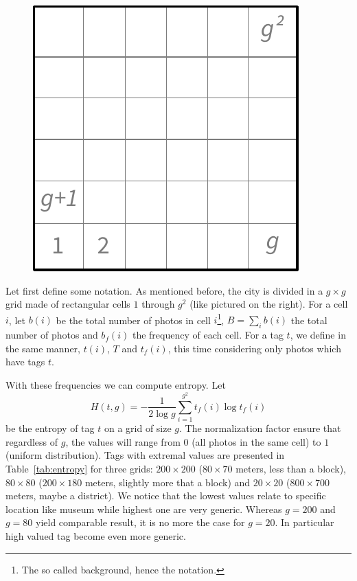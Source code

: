 \begin{figure}
\centering
\vspace{-.6\baselineskip}
\includegraphics[width=0.15\columnwidth]{grid}
\end{figure}
Let first define some notation. As mentioned before, the city is divided in a
$g\times g$ grid made of rectangular cells $1$ through $g^2$ (like pictured on
the right). For a cell $i$, let $b(i)$ be the total number of photos in cell
$i$\footnote{The so called background, hence the notation.}, $B=\sum_i b(i)$
the total number of photos and $b_f(i)$ the frequency of each cell. For a tag
$t$, we define in the same manner, $t(i)$, $T$ and $t_f(i)$, this time
considering only photos which have tags $t$.

With these frequencies we can compute entropy. Let \[H(t,g) = -\frac{1}{2\log
g}\sum_{i=1}^{g^2} t_f(i)\log t_f(i)\] be the entropy of tag $t$ on a grid of
size $g$. The normalization factor ensure that regardless of $g$, the values
will range from $0$ (all photos in the same cell) to $1$ (uniform
distribution). Tags with extremal values are presented in
Table~\vref{tab:entropy} for three grids: $200\times 200$ ($80\times 70$ meters,
less than a block), $80\times 80$ ($200\times 180$ meters, slightly more that
a block) and $20\times 20$ ($800\times 700$ meters, maybe a district). We notice
that the lowest values relate to specific location like museum while highest
one are very generic. Whereas $g=200$ and $g=80$ yield comparable result, it
is no more the case for $g=20$. In particular high valued tag become even more
generic.

